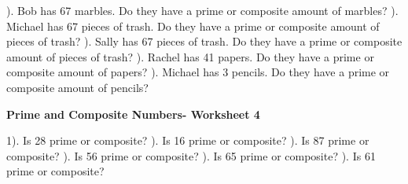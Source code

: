 \documentclass{article}%
\begin{document}
\newline%
). Bob has 67 marbles. Do they have a prime or composite amount of marbles?%
\newline%
\newline%
). Michael has 67 pieces of trash. Do they have a prime or composite amount of pieces of trash?%
\newline%
\newline%
). Sally has 67 pieces of trash. Do they have a prime or composite amount of pieces of trash?%
\newline%
\newline%
). Rachel has 41 papers. Do they have a prime or composite amount of papers?%
\newline%
\newline%
). Michael has 3 pencils. Do they have a prime or composite amount of pencils?%
\newline%
\newline%
\newline%
\pagebreak%
\large%
\begin{center}%
\textbf{Prime and Composite Numbers- Worksheet 4}%
\newline%
\newline%
\newline%
\end{center} \normalsize%
1). Is 28 prime or composite?%
\newline%
\newline%
). Is 16 prime or composite?%
\newline%
\newline%
). Is 87 prime or composite?%
\newline%
\newline%
). Is 56 prime or composite?%
\newline%
\newline%
). Is 65 prime or composite?%
\newline%
\newline%
). Is 61 prime or composite?%
\newline%
\end{document}
